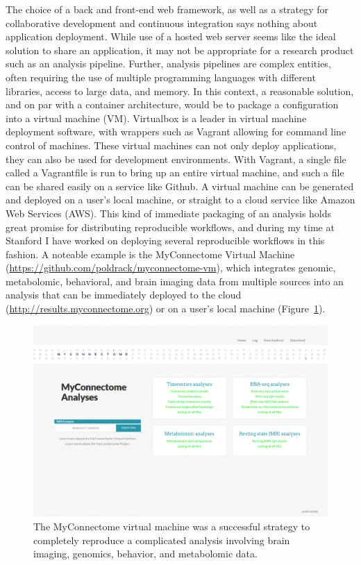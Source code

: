 \documentclass{report}
\begin{document}
The choice of a back and front-end web framework, as well as a strategy
for collaborative development and continuous integration says nothing
about application deployment. While use of a hosted web server seems
like the ideal solution to share an application, it may not be
appropriate for a research product such as an analysis pipeline.
Further, analysis pipelines are complex entities, often requiring the
use of multiple programming languages with different libraries, access
to large data, and memory. In this context, a reasonable solution, and
on par with a container architecture, would be to package a
configuration into a virtual machine (VM). Virtualbox \cite{noauthor_undated-id} is
a leader in virtual machine deployment software, with wrappers such as
Vagrant \cite{noauthor_undated-tk} allowing
for command line control of machines. These virtual machines can not
only deploy applications, they can also be used for development
environments. With Vagrant, a single file called a Vagrantfile is run to
bring up an entire virtual machine, and such a file can be shared easily
on a service like Github. A virtual machine can be generated and
deployed on a user's local machine, or straight to a cloud service like
Amazon Web Services (AWS). This kind of immediate packaging of an
analysis holds great promise for distributing reproducible workflows,
and during my time at Stanford I have worked on deploying several
reproducible workflows in this fashion. A noteable example is the
MyConnectome Virtual Machine
(\href{https://github.com/poldrack/myconnectome-vm}{https://github.com/poldrack/myconnectome-vm}),
which integrates genomic, metabolomic, behavioral, and brain imaging
data from multiple sources into an analysis that can be immediately
deployed to the cloud
(\href{http://results.myconnectome.org}{http://results.myconnectome.org})
or on a user's local machine (Figure~\ref{fig:53}).

\begin{figure}[ht!]
\begin{center}
\includegraphics[width=15cm]{images/figure53.png}
\end{center}
 \caption{\label{fig:53} The MyConnectome virtual machine was a successful strategy
to completely reproduce a complicated analysis involving brain imaging,
genomics, behavior, and metabolomic data.}
\end{figure}
\end{document}
